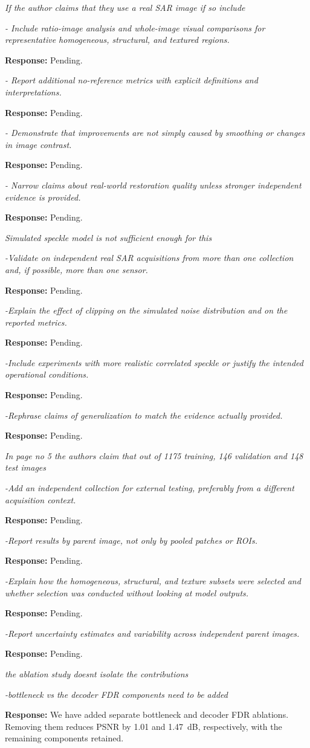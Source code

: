 \documentclass[11pt,letterpaper]{article}
\newcommand{\pendingbullet}[1]{%
  \Needspace{4\baselineskip}%
  \textit{#1}\par
  {\small\textbf{Response:} Pending.}\par
  \vspace{3pt}%
}
\newcommand{\reviewgroup}[1]{%
  \Needspace{5\baselineskip}%
  \medskip\textit{#1}\par
}
\begin{document}
\reviewgroup{If the author claims that they use a real SAR image if so include}

\pendingbullet{- Include ratio-image analysis and whole-image visual comparisons for representative homogeneous, structural, and textured regions.}

\pendingbullet{- Report additional no-reference metrics with explicit definitions and interpretations.}

\pendingbullet{- Demonstrate that improvements are not simply caused by smoothing or changes in image contrast.}

\pendingbullet{- Narrow claims about real-world restoration quality unless stronger independent evidence is provided.}

\reviewgroup{Simulated speckle model is not sufficient enough for this}

\pendingbullet{-Validate on independent real SAR acquisitions from more than one collection and, if possible, more than one sensor.}

\pendingbullet{-Explain the effect of clipping on the simulated noise distribution and on the reported metrics.}

\pendingbullet{-Include experiments with more realistic correlated speckle or justify the intended operational conditions.}

\pendingbullet{-Rephrase claims of generalization to match the evidence actually provided.}

\reviewgroup{In page no 5 the authors claim that out of 1175 training, 146 validation and 148 test images}

\pendingbullet{-Add an independent collection for external testing, preferably from a different acquisition context.}

\pendingbullet{-Report results by parent image, not only by pooled patches or ROIs.}

\pendingbullet{-Explain how the homogeneous, structural, and texture subsets were selected and whether selection was conducted without looking at model outputs.}

\pendingbullet{-Report uncertainty estimates and variability across independent parent images.}

\reviewgroup{the ablation study doesn\textquotesingle{}t isolate the contributions}

\textit{-bottleneck vs the decoder FDR components need to be added}

\textbf{Response:} We have added separate bottleneck and decoder FDR ablations. Removing them reduces PSNR by 1.01 and 1.47~dB, respectively, with the remaining components retained.
\end{document}
